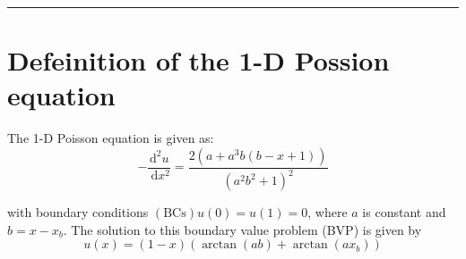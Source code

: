 \documentclass[twoside,twocolumn,10pt]{article}
\begin{document}

\hrule 
\newpage

\appendix
\section{Defeinition of the 1-D Possion equation}
\label{Apdx:Q1}
The 1-D Poisson equation is given as:
\begin{equation}
-\frac{\mathrm{d}^2 u}{\mathrm{~d} x^2}=\frac{2\left(a+a^3 b(b-x+1)\right)}{\left(a^2 b^2+1\right)^2}
\end{equation}

with boundary conditions $(\mathrm{BCs}) u(0)=u(1)=0$, where $a$ is constant and $b=x-x_b$. The solution to this boundary value problem (BVP) is given by
\begin{equation}
u(x)=(1-x)\left(\arctan (a b)+\arctan \left(a x_b\right)\right)
\end{equation}
\end{document}
